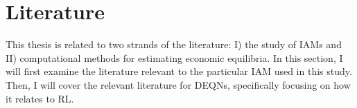 \section{Literature}

This thesis is related to two strands of the literature: I) the study of IAMs and II) computational methods for estimating economic equilibria. In this section, I will first examine the literature relevant to the particular IAM used in this study. Then, I will cover the relevant literature for DEQNs, specifically focusing on how it relates to RL.




%


